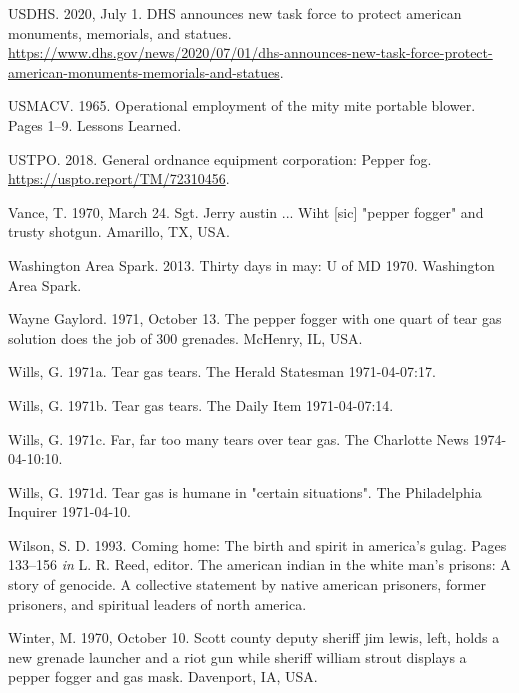 \documentclass[
  11pt,
]{krantz}
\newlength{\cslhangindent}
\newenvironment{CSLReferences}[2] %
 {%
  \setlength{\parindent}{0pt}
  \ifodd #1 \everypar{\setlength{\hangindent}{\cslhangindent}}\ignorespaces\fi
  \ifnum #2 > 0
  \setlength{\parskip}{#2\baselineskip}
  \fi
 }%
 {}
\begin{document}
\begin{CSLReferences}{1}{0}
\leavevmode{}%
USDHS. 2020, July 1. DHS announces new task force to protect american monuments, memorials, and statues. \url{https://www.dhs.gov/news/2020/07/01/dhs-announces-new-task-force-protect-american-monuments-memorials-and-statues}.

\leavevmode{}%
USMACV. 1965. Operational employment of the mity mite portable blower. Pages 1--9. Lessons Learned.

\leavevmode{}%
USTPO. 2018. General ordnance equipment corporation: Pepper fog. \url{https://uspto.report/TM/72310456}.

\leavevmode{}%
Vance, T. 1970, March 24. Sgt. Jerry austin ... Wiht {[}sic{]} "pepper fogger" and trusty shotgun. Amarillo, TX, USA.

\leavevmode{}%
Washington Area Spark. 2013. Thirty days in may: U of MD 1970. {Washington Area Spark}.

\leavevmode{}%
Wayne Gaylord. 1971, October 13. The pepper fogger with one quart of tear gas solution does the job of 300 grenades. McHenry, IL, USA.

\leavevmode{}%
Wills, G. 1971a. Tear gas tears. The Herald Statesman 1971-04-07:17.

\leavevmode{}%
Wills, G. 1971b. Tear gas tears. The Daily Item 1971-04-07:14.

\leavevmode{}%
Wills, G. 1971c. Far, far too many tears over tear gas. The Charlotte News 1974-04-10:10.

\leavevmode{}%
Wills, G. 1971d. Tear gas is humane in "certain situations". The Philadelphia Inquirer 1971-04-10.

\leavevmode{}%
Wilson, S. D. 1993. Coming home: The birth and spirit in america's gulag. Pages 133--156 \emph{in} L. R. Reed, editor. The american indian in the white man's prisons: A story of genocide. A collective statement by native american prisoners, former prisoners, and spiritual leaders of north america.

\leavevmode{}%
Winter, M. 1970, October 10. Scott county deputy sheriff jim lewis, left, holds a new grenade launcher and a riot gun while sheriff william strout displays a pepper fogger and gas mask. Davenport, IA, USA.


\end{CSLReferences}
\end{document}
